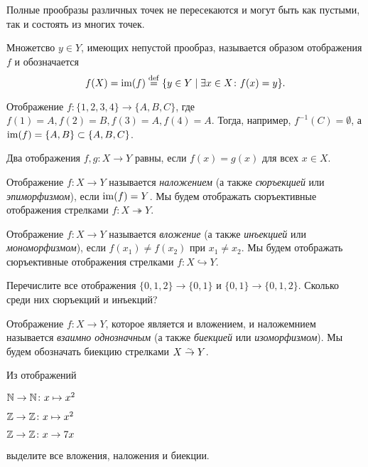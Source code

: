 \begin{remark}
    Полные прообразы различных точек не пересекаются и могут быть как пустыми, так и состоять из многих точек.
\end{remark}


\begin{definition}
    Множетсво $y \in Y$, имеющих непустой прообраз, называется образом отображения $f$ и обозначается \[ f(X) = \operatorname{im} (f) \overset{\footnotesize{\mathrm{def}}}{=} \{y \in Y \mid \exists x \in X \colon f(x) = y \}. \]
\end{definition}

\begin{example}
    Отображение $f \colon \{1, 2, 3, 4 \} \to \{ A, B, C \}$, где $f(1) = A, f(2) = B, f(3) = A, f(4) = A$. Тогда, например, $f^{-1}(C) = \emptyset$, а $\operatorname{im} (f) = \{A, B \} \subset \{A, B, C \}$.
\end{example}

Два отображения $f, g \colon X \to Y$ равны, если $f(x) = g(x) $ для всех $x \in X$.

\begin{definition}[Сюръекция]
    Отображение $f \colon X \to Y$ называется \emph{наложением} (а также \emph{сюръекцией} или \emph{эпиморфизмом}), если $\operatorname{im}(f) = Y$. Мы будем отображать сюръективные отображения стрелками $f \colon X \twoheadrightarrow Y$. 
\end{definition}
\begin{definition}[Инъекция]
    Отображение $f \colon X \to Y$ называется \emph{вложение} (а также \emph{инъекцией} или \emph{мономорфизмом}), если $f(x_1) \neq f(x_2)$ при $x_1 \neq x_2$. Мы будем отображать сюръективные отображения стрелками $f \colon X \hookrightarrow Y$. 
\end{definition}

\begin{practice}
    Перечислите все отображения $\{0, 1, 2\} \to \{0, 1\}$ и $\{0, 1\} \to \{0, 1, 2\}$. Сколько среди них сюръекций и инъекций?
\end{practice}

\begin{definition}[Биекция]
    Отображение $f \colon X \to Y$, которое является и вложением, и наложемнием называется \emph{взаимно однозначным} (а также \emph{биекцией} или \emph{изоморфизмом}). Мы будем обозначать биекцию стрелками $X \overset{_\sim}{\to} Y$.
\end{definition}
\begin{practice}
    Из отображений \begin{inumerate}
        \item $\mathbb N \to \mathbb N \colon x \mapsto x^2$
        \item $\mathbb Z \to \mathbb Z \colon x \mapsto x^2$ 
        \item $\mathbb Z \to \mathbb Z \colon x \to 7x $
    \end{inumerate} выделите все вложения, наложения и биекции.

    
\end{practice}

